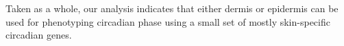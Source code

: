 
Taken as a whole, our analysis indicates that either dermis or epidermis can be used for phenotyping circadian phase using a small set of mostly skin-specific circadian genes.



